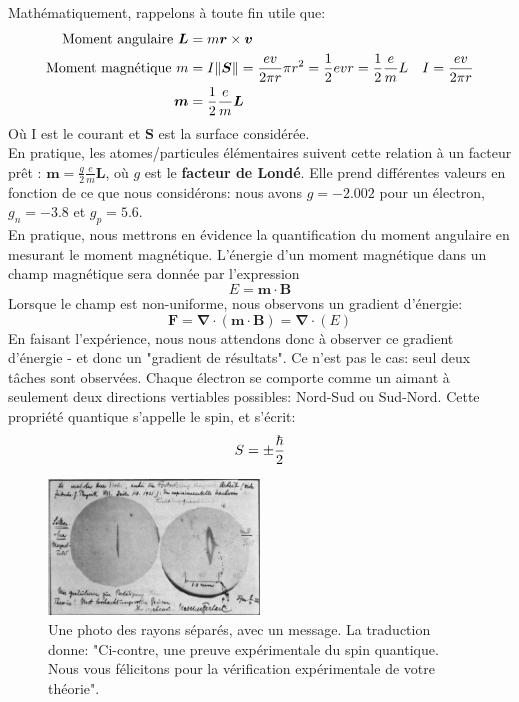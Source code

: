 \documentclass[../notesdecours.tex]{subfiles}
\begin{document}
Mathématiquement, rappelons à toute fin utile que:
\begin{align}
\text{Moment angulaire } \bm{L} &= m\bm{r}\times\bm{v} \label{Moment angulaire}\\
\text{Moment magnétique } m &= I\norm{\bm{S}}	= \frac{ev}{2\pi r} \pi r^2 = \frac{1}{2}evr = \frac{1}{2}\frac{e}{m}L	&I = \frac{ev}{2\pi r}\\
\bm{m} &= \frac{1}{2}\frac{e}{m}\bm{L} \label{moment magnétique}
\end{align}
Où I est le courant et $\bm{S}$ est la surface considérée.\\

En pratique, les atomes/particules élémentaires suivent cette relation à un facteur prêt : $\bm{m} = \frac{g}{2}\frac{e}{m}\bm{L}$, où $g$ est le \textbf{facteur de Londé}. Elle prend différentes valeurs en fonction de ce que nous considérons: nous avons $g = -2.002$ pour un électron, $g_n = -3.8$ et $g_p = 5.6$.\\

En pratique, nous mettrons en évidence la quantification du moment angulaire en mesurant le moment magnétique. L'énergie d'un moment magnétique dans un champ magnétique sera donnée par l'expression
\begin{equation}
E = \bm{m}\cdot\bm{B}
\end{equation}
Lorsque le champ est non-uniforme, nous observons un gradient d'énergie:
\begin{equation}
\bm{F} = \bm{\nabla}\cdot(\bm{m}\cdot\bm{B}) = \bm{\nabla}\cdot(E)
\end{equation}
En faisant l'expérience, nous nous attendons donc à observer ce gradient d'énergie - et donc un "gradient de résultats". Ce n'est pas le cas: seul deux tâches sont observées. Chaque électron se comporte comme un aimant à seulement deux directions vertiables possibles: Nord-Sud ou Sud-Nord. Cette propriété quantique s'appelle le spin, et s'écrit:
\begin{equation}
S = \pm \frac{\hbar}{2}
\end{equation}

\begin{center}
\begin{figure}[h]
\centering
\includegraphics[width=0.50\textwidth]{exp.png}
\caption{Une photo des rayons séparés, avec un message. La traduction donne: "Ci-contre, une preuve expérimentale du spin quantique. Nous vous félicitons pour la vérification expérimentale de votre théorie".}
\end{figure}
\end{center}
\newpage
\end{document}
